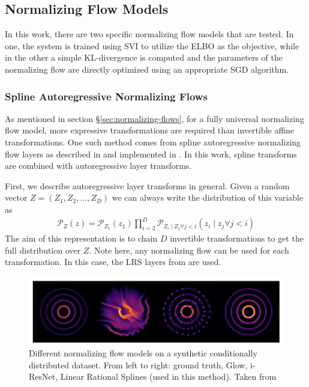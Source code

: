 \subsection{Normalizing Flow Models}
In this work, there are two specific normalizing flow models that are tested. In one, the system is trained using SVI to utilize the ELBO as the objective, while in the other a simple KL-divergence is computed and the parameters of the normalizing flow are directly optimized using an appropriate SGD algorithm.

\subsubsection{Spline Autoregressive Normalizing Flows}
As mentioned in section \S\ref{sec:normalizing-flows}, for a fully universal normalizing flow model, more expressive transformations are required than invertible affine transformations. One such method comes from spline autoregressive normalizing flow layers as described in \cite{dolatabadi_invertible_2020} and implemented in \cite{durkan_neural_2019}. In this work, spline transforms are combined with autoregressive layer transforms.

First, we describe autoregressive layer transforms in general. Given a random vector $Z = (Z_1, Z_2, \dots, Z_D)$ we can always write the distribution of this variable as
\begin{align*}
	\mathcal{P}_Z(z) = \mathcal{P}_{Z_1}(z_1)\prod_{i=2}^D \mathcal{P}_{Z_i \mid Z_j \forall j < i}(z_i \mid z_j \forall j < i)
\end{align*}
The aim of this representation is to chain $D$ invertible transformations to get the full distribution over $Z$. Note here, any normalizing flow can be used for each transformation. In this case, the LRS layers from \cite{dolatabadi_invertible_2020} are used.
\begin{figure}[h]
	\centering
	\includegraphics[width=\textwidth]{images/coupling-flow.png}
	\caption{Different normalizing flow models on a synthetic conditionally distributed dataset. From left to right: ground truth, Glow, i-ResNet, Linear Rational Splines (used in this method). Taken from \cite{dolatabadi_invertible_2020}}
	\label{fig:coupling-flow}
\end{figure}

